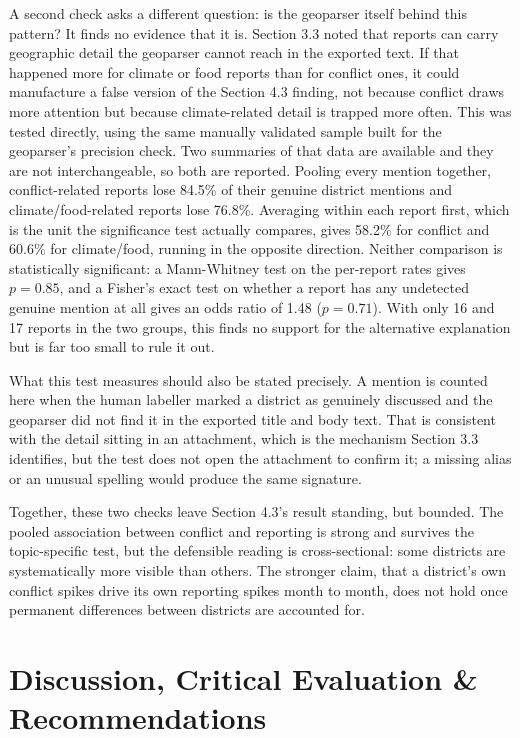 \documentclass[12pt,a4paper]{article}
\begin{document}
A second check asks a different question: is the geoparser itself behind this pattern? It finds no evidence that it is. Section 3.3 noted that reports can carry geographic detail the geoparser cannot reach in the exported text. If that happened more for climate or food reports than for conflict ones, it could manufacture a false version of the Section 4.3 finding, not because conflict draws more attention but because climate-related detail is trapped more often. This was tested directly, using the same manually validated sample built for the geoparser's precision check. Two summaries of that data are available and they are not interchangeable, so both are reported. Pooling every mention together, conflict-related reports lose 84.5\% of their genuine district mentions and climate/food-related reports lose 76.8\%. Averaging within each report first, which is the unit the significance test actually compares, gives 58.2\% for conflict and 60.6\% for climate/food, running in the opposite direction. Neither comparison is statistically significant: a Mann-Whitney test on the per-report rates gives $p = 0.85$, and a Fisher's exact test on whether a report has any undetected genuine mention at all gives an odds ratio of 1.48 ($p = 0.71$). With only 16 and 17 reports in the two groups, this finds no support for the alternative explanation but is far too small to rule it out.

What this test measures should also be stated precisely. A mention is counted here when the human labeller marked a district as genuinely discussed and the geoparser did not find it in the exported title and body text. That is consistent with the detail sitting in an attachment, which is the mechanism Section 3.3 identifies, but the test does not open the attachment to confirm it; a missing alias or an unusual spelling would produce the same signature.

Together, these two checks leave Section 4.3's result standing, but bounded. The pooled association between conflict and reporting is strong and survives the topic-specific test, but the defensible reading is cross-sectional: some districts are systematically more visible than others. The stronger claim, that a district's own conflict spikes drive its own reporting spikes month to month, does not hold once permanent differences between districts are accounted for.

\clearpage
\section{Discussion, Critical Evaluation \& Recommendations}
\end{document}
